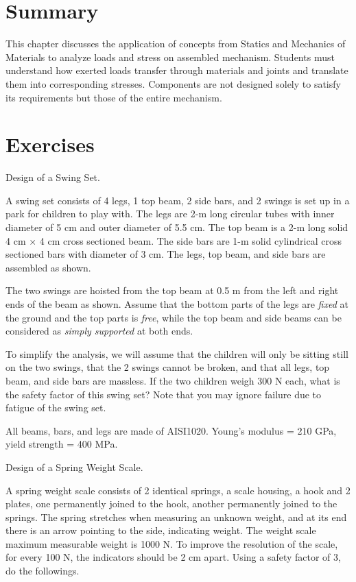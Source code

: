 \documentclass[
10pt,
a4paper,
openany,
svgnames,
]{book}
\newcommand{\exercise}{%
\item \label{lab:\arabic{chapter}-\arabic{exercisesi}}  %
}
\begin{document}
\section*{Summary}

This chapter discusses the application of concepts from Statics and Mechanics of Materials to analyze loads and stress on assembled mechanism. Students must understand how exerted loads transfer through materials and joints and translate them into corresponding stresses. Components are not designed solely to satisfy its requirements but those of the entire mechanism.

\section*{Exercises}

\begin{exercises}
  \exercise Design of a Swing Set.
  
  A swing set consists of 4 legs, 1 top beam, 2 side bars, and 2 swings is set up in a park for children to play with. The legs are 2-m long circular tubes with inner diameter of 5 cm and outer diameter of 5.5 cm. The top beam is a 2-m long solid 4 cm $\times$ 4 cm cross sectioned beam. The side bars are 1-m solid cylindrical cross sectioned bars with diameter of 3 cm. The legs, top beam, and side bars are assembled as shown.

  The two swings are hoisted from the top beam at 0.5 m from the left and right ends of the beam as shown. Assume that the bottom parts of the legs are \emph{fixed} at the ground and the top parts is \emph{free}, while the top beam and side beams can be considered as \emph{simply supported} at both ends.
  
  To simplify the analysis, we will assume that the children will only be sitting still on the two swings, that the 2 swings cannot be broken, and that all legs, top beam, and side bars are massless. If the two children weigh 300 N each, what is the safety factor of this swing set? Note that you may ignore failure due to fatigue of the swing set.
  
  All beams, bars, and legs are made of AISI1020. Young’s modulus = 210 GPa, yield strength = 400 MPa.
  
  \exercise Design of a Spring Weight Scale.
  
  A spring weight scale consists of 2 identical springs, a scale housing, a hook and 2 plates, one permanently joined to the hook, another permanently joined to the springs. The spring stretches when measuring an unknown weight, and at its end there is an arrow pointing to the side, indicating weight. The weight scale maximum measurable weight is 1000 N. To improve the resolution of the scale, for every 100 N, the indicators should be 2 cm apart. Using a safety factor of 3, do the followings.
  

\end{exercises}
\end{document}

